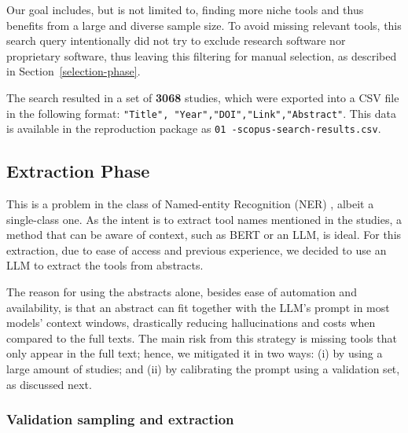 \documentclass[sigconf]{acmart}
\begin{document}
Our goal includes, but is not limited to, finding more niche tools and thus
benefits from a large and diverse sample size. To avoid missing relevant tools,
this search query intentionally did not try to exclude research software nor
proprietary software, thus leaving this filtering for manual selection, as
described in Section~\ref{selection-phase}.

The search resulted in a set of \textbf{3068} studies, which were exported
into a CSV file in the following format: \texttt{"Title",\allowbreak
"Year",\allowbreak "DOI",\allowbreak "Link",\allowbreak "Abstract"}. This
data is available in the reproduction package as \texttt{01\allowbreak
-scopus\allowbreak -search\allowbreak -results\allowbreak .csv}.

\subsection{Extraction Phase}\label{extraction-phase}

This is a problem in the class of Named-entity Recognition (NER)
\cite{pakhale2023ner}, albeit a single-class one. As the intent is to extract
tool names mentioned in the studies, a method that can be aware of context,
such as BERT or an LLM, is ideal. For this extraction, due to ease of access
and previous experience, we decided to use an LLM to extract the tools from
abstracts.

The reason for using the abstracts alone, besides ease of automation and
availability, is that an abstract can fit together with the LLM's prompt
in most models' context windows, drastically reducing hallucinations and
costs when compared to the full texts. The main risk from this strategy
is missing tools that only appear in the full text; hence, we mitigated
it in two ways: (i) by using a large amount of studies; and (ii) by
calibrating the prompt using a validation set, as discussed next.

\subsubsection{Validation sampling and extraction}\label{validation-set}
\end{document}
